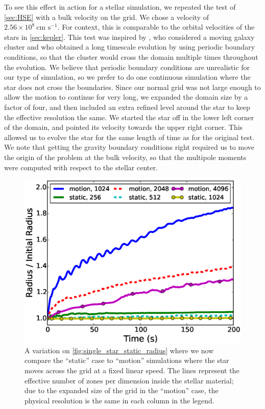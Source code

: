 \documentclass[iop]{../emulateapj}
\begin{document}
To see this effect in action for a stellar simulation, we repeated the test of  
\autoref{sec:HSE} with a bulk velocity on the grid. We chose a velocity of $2.56 \times 10^{8}\ \text{cm s}^{-1}$.
For context, this is comparable to the orbital velocities of the stars in \autoref{sec:kepler}.
This test was inspired by \citet{tasker:2008}, who considered a moving galaxy cluster 
and who obtained a long timescale evolution by using periodic boundary conditions, 
so that the cluster would cross the domain multiple times throughout the evolution.
We believe that periodic boundary conditions are unrealistic for our type of simulation,
so we prefer to do one continuous simulation where the star does not cross the boundaries.
Since our normal grid was not large enough to allow the motion to continue for very long, we expanded 
the domain size by a factor of four, and then included an extra refined level around the star to 
keep the effective resolution the same. We started the star off in the lower left corner of the domain, and 
pointed its velocity towards the upper right corner. This allowed us to evolve the star for the 
same length of time as for the original test. We note that getting the gravity boundary conditions right 
required us to move the origin of the problem at the bulk velocity, so that the multipole moments 
were computed with respect to the stellar center.

\begin{figure}
  \centering
  \includegraphics[scale=0.45]{plots/single_star_compare_1e3_radius}
  \caption{A variation on \autoref{fig:single_star_static_radius} where
    we now compare the ``static'' case to ``motion'' simulations where the 
    star moves across the grid at a fixed linear speed. The lines represent 
    the effective number of zones per dimension inside the stellar material;
    due to the expanded size of the grid in the ``motion'' case, the 
    physical resolution is the same in each column in the legend.
    \label{fig:single_star_compare_radius}}
\end{figure}
\end{document}
